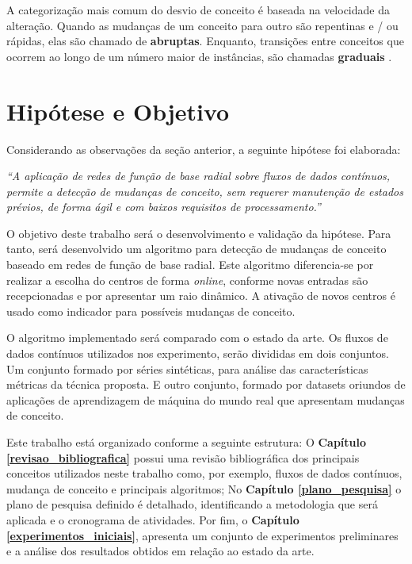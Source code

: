 \documentclass[qual, classic, a4paper]{ufbathesis}
\begin{document}
A categorização mais comum do desvio de conceito é baseada na velocidade da alteração. Quando as mudanças de um conceito para outro são repentinas e / ou rápidas, elas são chamado de \textbf{abruptas}. Enquanto, transições entre  conceitos que  ocorrem ao longo de um número maior de instâncias, são chamadas \textbf{graduais} \cite{Gama:2014:SCD:2597757.2523813}.



\section{Hipótese e Objetivo}

Considerando as observações da seção anterior, a seguinte hipótese foi elaborada:

\begin{center}
\textit{``A aplicação de redes de função de base radial sobre fluxos de dados contínuos, permite a detecção de mudanças de conceito, sem requerer manutenção de estados prévios, de forma ágil e com baixos requisitos de processamento.''}
\end{center}

O objetivo deste trabalho será o desenvolvimento e validação da hipótese.
Para tanto, será desenvolvido um algoritmo para detecção de mudanças de conceito baseado em redes de função de base radial. Este algoritmo diferencia-se por realizar a escolha do centros de forma \textit{online}, conforme novas entradas são recepcionadas e por apresentar um raio dinâmico. 
A ativação de novos centros é usado como indicador para possíveis mudanças de conceito.

O algoritmo implementado será comparado com o estado da arte. Os fluxos de dados contínuos utilizados nos experimento, serão divididas em dois conjuntos. Um conjunto formado por séries sintéticas, para análise das características métricas da técnica proposta. E outro conjunto, formado por datasets oriundos de aplicações de aprendizagem de máquina do mundo real que apresentam mudanças de conceito.

Este trabalho está organizado conforme a seguinte estrutura: O \textbf{Capítulo \ref{revisao_bibliografica}} possui uma revisão bibliográfica dos principais conceitos utilizados neste trabalho como, por exemplo, fluxos de dados contínuos, mudança de conceito e principais algoritmos; No \textbf{Capítulo \ref{plano_pesquisa}} o plano de pesquisa definido é detalhado, identificando a metodologia que será aplicada e o cronograma de atividades. Por fim, o \textbf{Capítulo \ref{experimentos_iniciais}}, apresenta um conjunto de experimentos preliminares e a análise dos resultados obtidos em relação ao estado da arte.
\end{document}
